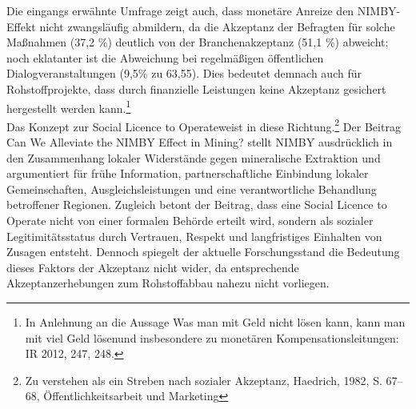 \documentclass[12pt,a4paper,oneside]{book} %
\begin{document}
{Die eingangs erwähnte Umfrage zeigt auch, dass monetäre Anreize den NIMBY-Effekt nicht zwangsläufig abmildern, da die Akzeptanz der Befragten für solche Maßnahmen (37,2 \%)  deutlich von der Branchenakzeptanz (51,1 \%) abweicht; noch eklatanter ist die Abweichung bei regelmäßigen öffentlichen Dialogveranstaltungen (9,5\% zu 63,55). Dies bedeutet demnach auch für Rohstoffprojekte, dass durch finanzielle Leistungen keine Akzeptanz gesichert hergestellt werden kann.\footnote{In Anlehnung an die Aussage \glqq Was man mit Geld nicht lösen kann, kann man mit viel Geld lösen\grqq und insbesondere zu monetären Kompensationsleitungen: IR 2012, 247, 248.}
\\
Das Konzept zur \glqq Social Licence to Operate\grqq weist in diese Richtung.\footnote{Zu verstehen als ein \glqq Streben nach sozialer Akzeptanz\grqq, Haedrich, 1982, S. 67–68, Öffentlichkeitsarbeit und Marketing} Der Beitrag Can We Alleviate the NIMBY Effect in Mining?\autocite{Can We Alleviate the NIMBY Effect in Mining? Demetrios C. Constantinides} stellt NIMBY ausdrücklich in den Zusammenhang lokaler Widerstände gegen mineralische Extraktion und argumentiert für frühe Information, partnerschaftliche Einbindung lokaler Gemeinschaften, Ausgleichsleistungen und eine verantwortliche Behandlung betroffener Regionen. Zugleich betont der Beitrag, dass eine Social Licence to Operate nicht von einer formalen Behörde erteilt wird, sondern als sozialer Legitimitätsstatus durch Vertrauen, Respekt und langfristiges Einhalten von Zusagen entsteht. Dennoch spiegelt der aktuelle Forschungsstand die Bedeutung dieses Faktors der Akzeptanz nicht wider, da entsprechende Akzeptanzerhebungen zum Rohstoffabbau nahezu nicht vorliegen.\autocites{Frenz 2025 S. 570-571}{Walter, Akzeptanzkommunikation in der Energie- und Rohstoffwirtschaft, 2023, S. 38ff.}

}
\end{document}
